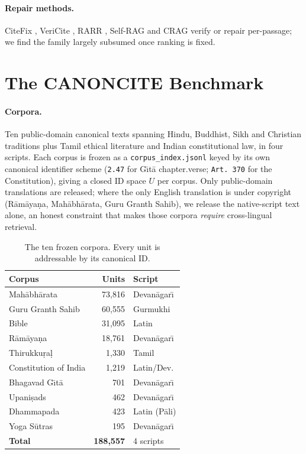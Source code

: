 \documentclass[11pt]{article}
\begin{document}
\paragraph{Repair methods.} CiteFix \cite{maheshwari2025citefix}, VeriCite
\cite{qian2025vericite}, RARR \cite{gao2023rarr}, Self-RAG
\cite{asai2024selfrag} and CRAG \cite{yan2024crag} verify or repair per-passage;
we find the family largely subsumed once ranking is fixed.

\section{The CANONCITE Benchmark}
\label{sec:bench}

\paragraph{Corpora.} Ten public-domain canonical texts spanning Hindu, Buddhist,
Sikh and Christian traditions plus Tamil ethical literature and Indian
constitutional law, in four scripts. Each corpus is frozen as a
\texttt{corpus\_index.jsonl} keyed by its own canonical identifier scheme
(\texttt{2.47} for G\={\i}t\={a} chapter.verse; \texttt{Art.~370} for the
Constitution), giving a closed ID space $U$ per corpus. Only public-domain
translations are released; where the only English translation is under copyright
(R\={a}m\={a}ya\d{n}a, Mah\={a}bh\={a}rata, Guru Granth Sahib), we release the
native-script text alone, an honest constraint that makes those corpora
\emph{require} cross-lingual retrieval.

\begin{table}[t]
\centering\small
\begin{tabular}{@{}lrl@{}}
\toprule
\textbf{Corpus} & \textbf{Units} & \textbf{Script} \\
\midrule
Mah\={a}bh\={a}rata & 73{,}816 & Devan\={a}gar\={\i} \\
Guru Granth Sahib & 60{,}555 & Gurmukhi \\
Bible & 31{,}095 & Latin \\
R\={a}m\={a}ya\d{n}a & 18{,}761 & Devan\={a}gar\={\i} \\
Thirukku\d{r}a\d{l} & 1{,}330 & Tamil \\
Constitution of India & 1{,}219 & Latin/Dev. \\
Bhagavad G\={\i}t\={a} & 701 & Devan\={a}gar\={\i} \\
Upani\d{s}ads & 462 & Devan\={a}gar\={\i} \\
Dhammapada & 423 & Latin (P\={a}li) \\
Yoga S\={u}tras & 195 & Devan\={a}gar\={\i} \\
\midrule
\textbf{Total} & \textbf{188{,}557} & 4 scripts \\
\bottomrule
\end{tabular}
\caption{The ten frozen corpora. Every unit is addressable by its canonical ID.}
\label{tab:corpora}
\end{table}
\end{document}

